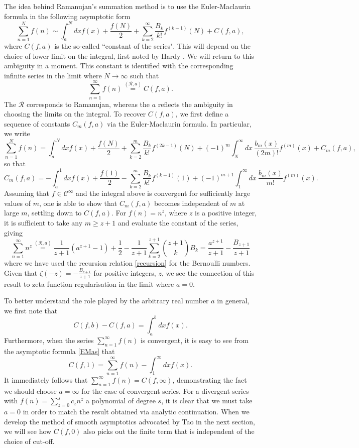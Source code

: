 \documentclass[12pt, letter]{article}
\def\be{\begin{equation}}
\def\ee{\end{equation}}
\newcommand{\Rcal}{\mathcal{R}}
\begin{document}
The idea behind Ramanujan's summation method is to use the Euler-Maclaurin formula in the following asymptotic form
\be \label{EMas}
\sum_{n=1}^N f(n) \sim \int^N_a dx f(x) + \frac{f(N)}{2}+ \sum \limits_{k=2}^{\infty}  \frac{B_{k}}{k!} f^{(k-1)}(N)+C(f, a),
\ee
where $C(f, a)$  is the so-called ``constant of  the series".  This will depend on the choice of  lower limit on the integral, first 
noted by Hardy \cite{Hardy73}. We will return to this ambiguity in a moment. This constant is identified with the corresponding  infinite series in the limit where $N \to \infty$ such that
\be
\sum_{n=1}^\infty f(n) \overset{(\mathcal{R}, a)}{=} C(f, a).
\ee
The $\Rcal$ corresponds  to Ramanujan, whereas the $a$ reflects the ambiguity in choosing the limits on the integral. To recover $C(f, a)$, we first  define a sequence of constants $C_m(f,a)$ via the Euler-Maclaurin formula. In particular, we write
\be
\sum_{n=1}^N f(n) = \int^N_a dx f(x) + \frac{f(N)}{2}+\sum \limits_{k=2}^m   \frac{B_{k}}{k!} f^{(2k-1)}(N)+(-1)^m \int^\infty_N dx \ \frac{b_{m}(x)}{(2m)!} f^{(m)}(x)+C_m(f, a),
\ee
so that 
\be
C_m(f, a)=-\int^1_a dx f(x) + \frac{f(1)}{2}-\sum \limits_{k=2}^m    \frac{B_{k}}{k!} f^{(k-1)}(1)+(-1)^{m+1}\int^\infty_1 dx \ \frac{b_{m}(x)}{m!} f^{(m)}(x).
\ee
Assuming that $f \in \mathcal{C}^\infty$ and the integral above is  convergent for sufficiently large values of $m$,  one is able to show that $C_m(f, a)$ becomes independent of $m$ at large $m$, settling down to  $C(f, a)$. For $f(n)=n^z$, where $z$ is a positive integer,  it is sufficient to take any $m \geq z+1$ and evaluate the constant of the series, giving 
\be \label{Intnz}
\sum_{n=1}^\infty n^z \overset{(\mathcal{R}, a)}{=} \frac{1}{z+1} (a^{z+1}-1)+\frac12 - \frac{1}{z+1}\sum \limits_{k=2}^{z+1}   \binom{z+1}{ k} B_{k}=\frac{a^{z+1}}{z+1}-\frac{B_{z+1}}{z+1}
\ee
where we have used the recursion relation \eqref{recursion} for the Bernoulli numbers. Given that $\zeta(-z)=-\frac{B_{z+1}}{z+1}$ for positive integers, $z$,  we see the connection of this result to zeta function regularisation in the limit where  $a=0$.


To better understand the role played by the arbitrary real number $a$ in general, we first note that
\be
C(f, b)-C(f, a)=\int_a^b dx f(x).
\ee
Furthermore, when the series $\sum_{n=1}^\infty f(n)$ is convergent, it is easy to see from the asymptotic formula \eqref{EMas} that \cite{Candelpergher17}
\be
C(f, 1)=\sum_{n=1}^\infty f(n) - \int^\infty_1 dx f(x).
\ee
It immediately follows that $\sum_{n=1}^\infty f(n) =C(f, \infty)$, demonstrating the fact we should choose $a=\infty$ for the case of convergent series. For a divergent series with  $f(n)=\sum_{z=0}^s c_z n^z$ a polynomial of degree  $s$,  it is clear that we must take $a=0$ in order to match the result obtained via analytic continuation.  When we develop the method of smooth asymptotics advocated by Tao \cite{Tao11} in the next section, we will see how $C(f, 0)$ also picks out the finite term that is independent of the choice of cut-off. 
\end{document}
